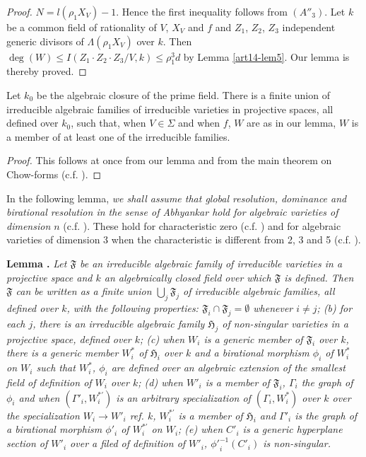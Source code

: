 \begin{proof}
$N=l(\rho_{1}X_{V})-1$. Hence the first inequality follows from $(A''_{3})$. Let $k$ be a common field of rationality of $V$, $X_{V}$ and $f$ and $Z_{1}$, $Z_{2}$, $Z_{3}$ independent generic divisors of $\Lambda(\rho_{1}X_{V})$ over $k$. Then $\deg(W)\leq I(Z_{1}\cdot Z_{2}\cdot Z_{3}/V,k)\leq \rho^{3}_{1}d$ by Lemma \ref{art14-lem5}. Our lemma is thereby proved.
\end{proof}

\begin{coro*}
Let $k_{0}$ be the algebraic closure of the prime field. There is a finite union of irreducible algebraic families of irreducible varieties in projective spaces, all defined over $k_{0}$, such that, when $V\in \Sigma$ and when $f$, $W$ are as in our lemma, $W$ is a member of at least one of the irreducible families.
\end{coro*}

\begin{proof}
This follows at once from our lemma and from the main theorem on Chow-forms (c.f. \cite{art14-key3}).
\end{proof}

In the following lemma, {\em we shall assume that global resolution, dominance and birational resolution in the sense of Abhyankar hold for algebraic varieties of dimension $n$} (c.f. \cite{art14-key35}). These hold for characteristic zero (c.f. \cite{art14-key5}) and for algebraic varieties of dimension 3 when the characteristic is different from 2, 3 and 5 (c.f. \cite{art14-key35}).

\medskip
\noindent
{\bf Lemma .\label{art14-lem8}}
{\em Let $\mathfrak{F}$ be an irreducible algebraic family of irreducible varieties in a projective space and $k$ an algebraically closed field over which $\mathfrak{F}$ is defined. Then $\mathfrak{F}$ can be written as a finite union $\bigcup_{j}\mathfrak{F}_{j}$ of irreducible algebraic families, all defined over $k$, with the following properties: $\mathfrak{F}_{i}\cap \mathfrak{F}_{j}=\emptyset$ whenever $i\neq j$; {\rm(b)} for each $j$, there is an irreducible algebraic family $\mathfrak{H}_{j}$ of non-singular varieties in a projective space, defined over $k$; {\rm(c)} when $W_{i}$ is a generic member of $\mathfrak{F}_{i}$ over $k$, there is a generic member $W^{*}_{i}$ of $\mathfrak{H}_{i}$ over $k$ and a birational morphism $\phi_{i}$ of $W^{*}_{i}$ on $W_{i}$ such that $W^{*}_{i}$, $\phi_{i}$ are defined over an algebraic extension of the smallest field of definition of $W_{i}$ over $k$; {\rm(d)} when $W'_{i}$ is a member of $\mathfrak{F}_{i}$, $\Gamma_{i}$ the graph of $\phi_{i}$ and when $(\Gamma'_{i},W^{*'}_{i})$ is an arbitrary specialization of $(\Gamma_{i},W^{*}_{i})$ over $k$ over the specialization $W_{i}\to W'_{i}$ ref. $k$, $W^{*'}_{i}$ is a member of $\mathfrak{H}_{i}$ and $\Gamma'_{i}$ is the graph of a birational morphism $\phi'_{i}$ of $W^{*'}_{i}$ on $W_{i}$; {\rm(e)} when $C'_{i}$ is a generic hyperplane section of $W'_{i}$ over a filed of definition of $W'_{i}$, ${\phi'}^{-1}_{i}(C'_{i})$ is non-singular.}

